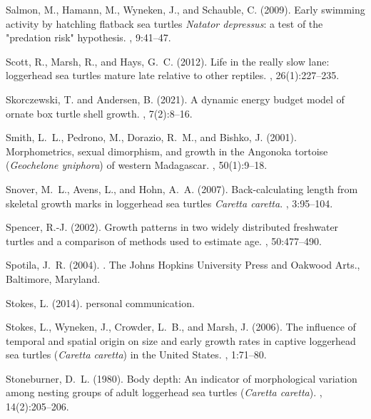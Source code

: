 \documentclass{article}
\begin{document}
\begin{thebibliography}{}
Salmon, M., Hamann, M., Wyneken, J., and Schauble, C. (2009).
\newblock Early swimming activity by hatchling flatback sea turtles
  \emph{Natator depressus}: a test of the "predation risk" hypothesis.
, 9:41--47.

Scott, R., Marsh, R., and Hays, G.~C. (2012).
\newblock Life in the really slow lane: loggerhead sea turtles mature late
  relative to other reptiles.
, 26(1):227--235.

Skorczewski, T. and Andersen, B. (2021).
\newblock A dynamic energy budget model of ornate box turtle shell growth.
, 7(2):8--16.

Smith, L.~L., Pedrono, M., Dorazio, R.~M., and Bishko, J. (2001).
\newblock Morphometrics, sexual dimorphism, and growth in the {A}ngonoka
  tortoise (\emph{Geochelone yniphora}) of western {M}adagascar.
, 50(1):9--18.

Snover, M.~L., Avens, L., and Hohn, A.~A. (2007).
\newblock Back-calculating length from skeletal growth marks in loggerhead sea
  turtles \textit{Caretta caretta}.
, 3:95--104.

Spencer, R.-J. (2002).
\newblock Growth patterns in two widely distributed freshwater turtles and a
  comparison of methods used to estimate age.
, 50:477--490.

Spotila, J.~R. (2004).
.
\newblock The Johns Hopkins University Press and Oakwood Arts., Baltimore,
  Maryland.

Stokes, L. (2014).
\newblock personal communication.

Stokes, L., Wyneken, J., Crowder, L.~B., and Marsh, J. (2006).
\newblock The influence of temporal and spatial origin on size and early growth
  rates in captive loggerhead sea turtles (\textit{Caretta caretta}) in the
  {U}nited {S}tates.
, 1:71--80.

Stoneburner, D.~L. (1980).
\newblock Body depth: An indicator of morphological variation among nesting
  groups of adult loggerhead sea turtles (\textit{Caretta caretta}).
, 14(2):205--206.


\end{thebibliography}
\end{document}
